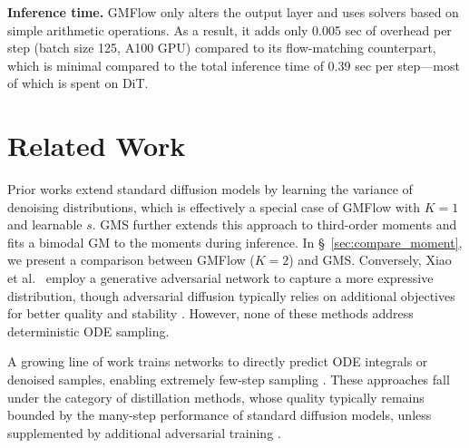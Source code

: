 \documentclass{article}
\theoremstyle{custom}
\theoremstyle{definition}
\theoremstyle{remark}
\begin{document}
\begin{table}[t]
\caption{Validation NLL of ImageNet training images (latents) under different GMFlow configurations.}
\label{tab:likelihood}
\begin{center}
\end{center}
\end{table}

\textbf{Inference time.}
GMFlow only alters the output layer and uses solvers based on simple arithmetic operations. As a result, it adds only 0.005 sec of overhead per step (batch size 125, A100 GPU) compared to its flow-matching counterpart, which is minimal compared to the total inference time of 0.39 sec per step---most of which is spent on DiT.
 \section{Related Work}
Prior works \cite{iddpm,analyticdpm,bao2022estimating} extend standard diffusion models by learning the variance of denoising distributions, which is effectively a special case of GMFlow with $K = 1$ and learnable $s$. GMS \cite{gms} further extends this approach to third-order moments and fits a bimodal GM to the moments during inference. In \S~\ref{sec:compare_moment}, we present a comparison between GMFlow ($K=2$) and GMS. Conversely, Xiao et al.~ employ a generative adversarial network \cite{GAN} to capture a more expressive distribution, though adversarial diffusion typically relies on additional objectives for better quality and stability \cite{adversarialscorematching,kim2024consistency}. However, none of these methods address deterministic ODE sampling.

A growing line of work trains networks to directly predict ODE integrals or denoised samples, enabling extremely few-step sampling \cite{salimans2022progressive,consistencymodels,yin2024onestep,sauer2025adversarial}. These approaches fall under the category of distillation methods, whose quality typically remains bounded by the many-step performance of standard diffusion models, unless supplemented by additional adversarial training \cite{kim2024consistency,yin2024improved}.
\end{document}
